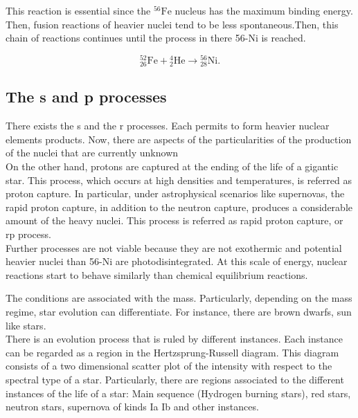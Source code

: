 \documentclass[openany]{book}
\begin{document}
This reaction is essential since the $\mathrm{{}^{56}Fe}$ nucleus has the maximum binding energy. Then, fusion reactions of heavier nuclei tend to be less spontaneous.Then,  this chain of reactions continues until the process in there 56-Ni is reached.

\begin{equation}
	\mathrm{{}^{52}_{26}Fe +{}^{4}_{2}He \rightarrow {}^{56}_{28}Ni}.
\end{equation}


\subsection{The s and p processes}

There exists the s and  the r processes. Each permits to form heavier nuclear elements products. Now, there are aspects of the particularities of the production of the nuclei that  are currently  unknown \\

On the other hand, protons are captured at the ending of the life of a gigantic star. This process, which occurs at high densities and temperatures, is referred as proton capture. In particular, under astrophysical scenarios like supernovas, the rapid proton capture, in addition to the neutron capture,  produces a considerable amount of the heavy nuclei. This process is referred as rapid proton capture, or rp process. \\ 

Further processes are not viable because they are not exothermic and potential heavier nuclei than 56-Ni are photodisintegrated. At this scale of energy, nuclear reactions start to behave similarly than chemical equilibrium reactions. 

The conditions are associated with the mass. Particularly, depending on the mass regime, star evolution can differentiate. For instance, there are brown dwarfs, sun like stars. \\

There is an evolution process that is ruled by different instances. Each instance can be regarded as a region in the Hertzsprung-Russell diagram. This diagram consists of a two dimensional scatter plot of the intensity with respect to the spectral type of a star. Particularly, there are regions associated to the different instances of the life of a star: Main sequence (Hydrogen burning stars), red stars, neutron stars, supernova of kinds Ia Ib and other instances. \\
\end{document}
